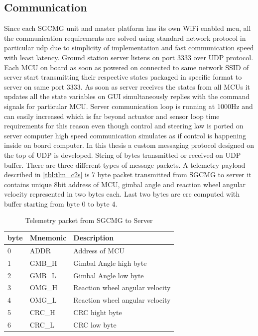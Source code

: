 \subsection{Communication}
Since each SGCMG unit and master platform has its own WiFi enabled \acrshort{mcu}, all the communication requirements are solved using standard network protocol in particular \acrfull{udp} due to simplicity of implementation and fast communication speed with least latency. Ground station server listens on port 3333 over UDP protocol. Each MCU on board as soon as powered on connected to same network SSID of server start transmitting their respective states packaged in specific format to server on same port 3333. As soon as server receives the states from all MCUs it updates all the state variables on GUI simultaneously replies with the command signals for particular MCU. Server communication loop is running at 1000Hz and can easily increased which is far beyond actuator and sensor loop time requirements for this reason even though control and steering law is ported on server computer high speed communication simulates as if control is happening inside on board computer. In this thesis a custom messaging protocol designed on the top of UDP is developed. String of bytes transmitted or received on UDP buffer. There are three different types of message packets. A telemetry payload described in \autoref{tbl:tlm_c2s} is 7 byte packet transmitted from SGCMG to server it contains unique 8bit address of MCU, gimbal angle and reaction wheel angular velocity represented in two bytes each. Last two bytes are \acrfull{crc} computed with buffer starting from byte 0 to byte 4.

\begin{table}[ht]
        \centering
\begin{tabular}{|p{}|p{}|p{}|}
\hline 
 byte & Mnemonic & Description \\
\hline 
 0 & ADDR & Address of MCU \\
\hline 
 1 & GMB\_H & Gimbal Angle high byte \\
\hline 
 2 & GMB\_L & Gimbal Angle low byte \\
\hline 
 3 & OMG\_H & Reaction wheel angular velocity \\
\hline 
 4 & OMG\_L & Reaction wheel angular velocity \\
\hline 
 5 & CRC\_H & CRC hight byte \\
\hline 
 6 & CRC\_L & CRC low byte \\
 \hline
\end{tabular}
        \caption{Telemetry packet from SGCMG to Server}
        \label{tbl:tlm_c2s}
        \end{table}


